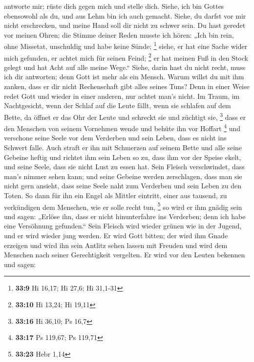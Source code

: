 antworte mir; rüste dich gegen mich und stelle dich. 
Siehe, ich bin Gottes ebensowohl als du, und aus Lehm bin ich auch
gemacht.  Siehe, du darfst vor mir nicht erschrecken, und
meine Hand soll dir nicht zu schwer sein.  Du hast geredet
vor meinen Ohren; die Stimme deiner Reden musste ich hören:
 „Ich bin rein, ohne Missetat, unschuldig und habe keine
Sünde; \footnote{\textbf{33:9} Hi 16,17; Hi 27,6; Hi 31,1-31}
 siehe, er hat eine Sache wider mich gefunden, er achtet
mich für seinen Feind; \footnote{\textbf{33:10} Hi 13,24; Hi 19,11}
 er hat meinen Fuß in den Stock gelegt und hat Acht auf
alle meine Wege.``  Siehe, darin hast du nicht recht,
muss ich dir antworten; denn Gott ist mehr als ein Mensch.
 Warum willst du mit ihm zanken, dass er dir nicht
Rechenschaft gibt alles seines Tuns?  Denn in einer Weise
redet Gott und wieder in einer anderen, nur achtet man's nicht.
 Im Traum, im Nachtgesicht, wenn der Schlaf auf die Leute
fällt, wenn sie schlafen auf dem Bette,  da öffnet er das
Ohr der Leute und schreckt sie und züchtigt sie, \footnote{\textbf{33:16}
  Hi 36,10; Ps 16,7}  dass er den Menschen von seinem
Vornehmen wende und behüte ihn vor Hoffart \footnote{\textbf{33:17} Ps
  119,67; Ps 119,71}  und verschone seine Seele vor dem
Verderben und sein Leben, dass es nicht ins Schwert falle.
 Auch straft er ihn mit Schmerzen auf seinem Bette und
alle seine Gebeine heftig  und richtet ihm sein Leben so
zu, dass ihm vor der Speise ekelt, und seine Seele, dass sie nicht Lust
zu essen hat.  Sein Fleisch verschwindet, dass man's
nimmer sehen kann; und seine Gebeine werden zerschlagen, dass man sie
nicht gern ansieht,  dass seine Seele naht zum Verderben
und sein Leben zu den Toten.  So dann für ihn ein Engel
als Mittler eintritt, einer aus tausend, zu verkündigen dem Menschen,
wie er solle recht tun, \footnote{\textbf{33:23} Hebr 1,14}
 so wird er ihm gnädig sein und sagen: „Erlöse ihn, dass
er nicht hinunterfahre ins Verderben; denn ich habe eine Versöhnung
gefunden.``  Sein Fleisch wird wieder grünen wie in der
Jugend, und er wird wieder jung werden.  Er wird Gott
bitten; der wird ihm Gnade erzeigen und wird ihn sein Antlitz sehen
lassen mit Freuden und wird dem Menschen nach seiner Gerechtigkeit
vergelten.  Er wird vor den Leuten bekennen und sagen:
